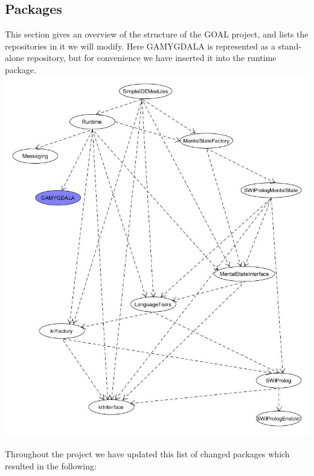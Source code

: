 \documentclass[]{article}
\begin{document}
\subsection{Packages}
This section gives an overview of the structure of the GOAL project, and lists the repositories in it we will modify. Here GAMYGDALA is represented as a stand-alone repository, but for convenience we have inserted it into the runtime package.\\
\includegraphics[scale = 0.5]{Maven_dependency_tree_UML.jpg}\\
\\
Throughout the project we have updated this list of changed packages which resulted in the following:
\end{document}
